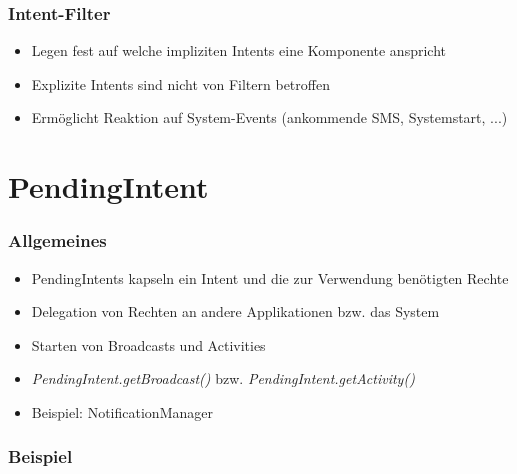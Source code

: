 \begin{frame}
   \frametitle{Intent-Filter}
   \begin{itemize}
      \item Legen fest auf welche impliziten Intents eine Komponente anspricht
      \item Explizite Intents sind nicht von Filtern betroffen
      \item Ermöglicht Reaktion auf System-Events (ankommende SMS, Systemstart, ...)
   \end{itemize}

   
\end{frame}

\section{PendingIntent}
\begin{frame}
   \frametitle{Allgemeines}
   \begin{itemize}
      \item PendingIntents kapseln ein Intent und die zur Verwendung benötigten Rechte
      \item Delegation von Rechten an andere Applikationen bzw. das System
      \item Starten von Broadcasts und Activities 
      \item \emph{PendingIntent.getBroadcast()} bzw. \emph{PendingIntent.getActivity()} 
      \item Beispiel: NotificationManager
   \end{itemize}
\end{frame}

\begin{frame}
   \frametitle{Beispiel}
	
\end{frame}


